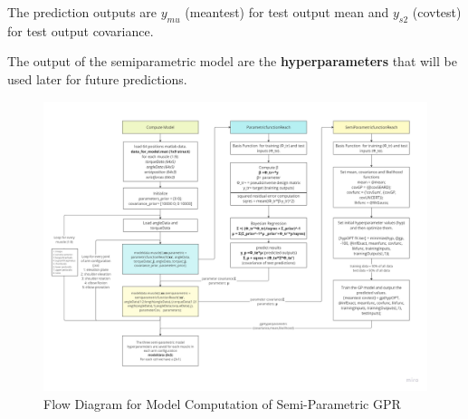 The prediction outputs are $y_{mu}$ (meantest) for test output mean and $y_{s2}$ (covtest) for test output covariance. 

The output of the semiparametric model are the \textbf{hyperparameters} that will be used later for future predictions.

\newpage
\begin{landscape} %
  \begin{figure}[h!]
    \centering
    \includegraphics[width=1.4\textwidth]{Pictures/Model/computemodel.png} %
    \caption{Flow Diagram for Model Computation of Semi-Parametric GPR} %
    \label{fig:ModelComputationGPR} %
  \end{figure}
\end{landscape} %

